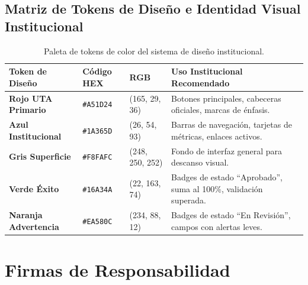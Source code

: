 \documentclass[12pt,a4paper]{article}
\begin{document}
\subsection{Matriz de Tokens de Diseño e Identidad Visual Institucional}
\begin{table}[H]
\centering
\small
\renewcommand{\arraystretch}{1.2}
\begin{tabularx}{\textwidth}{|>{\hsize=0.9\hsize\raggedright\arraybackslash\bfseries\footnotesize}X|>{\hsize=0.4\hsize\centering\arraybackslash\footnotesize}X|>{\hsize=0.5\hsize\centering\arraybackslash\footnotesize}X|>{\hsize=2.2\hsize\raggedright\arraybackslash\footnotesize}X|}
\hline
\rowcolor{tableheader}
\textbf{Token de Diseño} & \textbf{Código HEX} & \textbf{RGB} & \textbf{Uso Institucional Recomendado} \\
\hline
Rojo UTA Primario & \texttt{\#A51D24} & (165, 29, 36) & Botones principales, cabeceras oficiales, marcas de énfasis. \\
\hline
Azul Institucional & \texttt{\#1A365D} & (26, 54, 93) & Barras de navegación, tarjetas de métricas, enlaces activos. \\
\hline
Gris Superficie & \texttt{\#F8FAFC} & (248, 250, 252) & Fondo de interfaz general para descanso visual. \\
\hline
Verde Éxito & \texttt{\#16A34A} & (22, 163, 74) & Badges de estado ``Aprobado'', suma al 100\%, validación superada. \\
\hline
Naranja Advertencia & \texttt{\#EA580C} & (234, 88, 12) & Badges de estado ``En Revisión'', campos con alertas leves. \\
\hline
\end{tabularx}
\caption{Paleta de tokens de color del sistema de diseño institucional.}
\end{table}

\section{Firmas de Responsabilidad}
\end{document}
